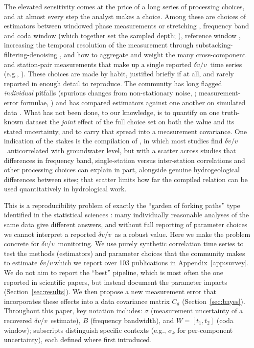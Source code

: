 \documentclass[
  referee]{gji}
\providecommand{\dvv}{\ensuremath{\delta v/v}}
\begin{document}
The elevated sensitivity comes at the price of a long series of
processing choices, and at almost every step the analyst makes a choice.
Among these are choices of estimators between windowed phase
measurements or stretching \citep[\citet{Mao2020},
\citet{Yuan2021}]{Mikesell2015}, frequency band and coda window (which
together set the sampled depth; \citeauthor{Obermann2013}
\citetext{\citeyear{Obermann2013}; \citealp{Obermann2016}}), reference
window \citep[\citet{Ermert2023}, \citet{Okubo2024}]{Brenguier2014},
increasing the temporal resolution of the measurement through
substacking-filtering-denoising
\citep[\citet{Moreau2017},\citet{Mao2019},\citet{Viens2020}]{Hadziioannou2011},
and how to aggregate and weight the many cross-component and
station-pair measurements that make up a single reported \dvv~time
series (e.g., \citet{Hobiger2012}). These choices are made by habit,
justified briefly if at all, and rarely reported in enough detail to
reproduce. The community has long flagged \emph{individual} pitfalls
(spurious changes from non-stationary noise, \citet{Zhan2013};
measurement-error formulae, \citeauthor{Clarke2011}
\citetext{\citeyear{Clarke2011}; \citealp{Weaver2011}}) and has compared
estimators against one another on simulated data \citep{Yuan2021}. What
has not been done, to our knowledge, is to quantify on one truth-known
dataset the \emph{joint} effect of the full choice set on both the value
and its stated uncertainty, and to carry that spread into a measurement
covariance. One indication of the stakes is the compilation of
\citet{Denolle25b}, in which most studies find \dvv~anticorrelated with
groundwater level, but with a scatter across studies that differences in
frequency band, single-station versus inter-station correlations and
other processing choices can explain in part, alongside genuine
hydrogeological differences between sites; that scatter limits how far
the compiled relation can be used quantitatively in hydrological work.

This is a reproducibility problem of exactly the ``garden of forking
paths'' type identified in the statistical sciences
\citep{Gelman2013, Steegen2016}: many individually reasonable analyses
of the same data give different answers, and without full reporting of
parameter choices we cannot interpret a reported \dvv~as a robust value.
Here we make the problem concrete for \dvv~monitoring. We use purely
synthetic correlation time series to test the methods (estimators) and
parameter choices that the community makes to estimate \dvv\(\,\)which
we report over 103 publications in Appendix~\ref{app:survey}. We do not
aim to report the ``best'' pipeline, which is most often the one
reported in scientific papers, but instead document the parameter
impacts (Section~\ref{sec:results}). We then propose a new measurement
error that incorporates these effects into a data covariance matrix
\(C_d\) (Section~\ref{sec:bayes}). Throughout this paper, key notation
includes: \(\sigma\) (measurement uncertainty of a recovered
\dvv~estimate), \(B\) (frequency bandwidth), and \(W=[t_1,t_2]\) (coda
window); subscripts distinguish specific contexts (e.g., \(\sigma_k\)
for per-component uncertainty), each defined where first introduced.
\end{document}
